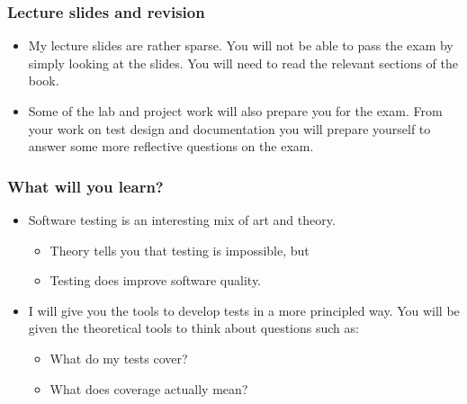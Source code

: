 \documentclass{beamer}
\begin{document}
\begin{frame}
  \frametitle{Lecture slides and revision}
  \begin{itemize}
  \item My lecture slides are rather sparse. You will not be able to
    pass the exam by simply looking at the slides. You will need to
    read the relevant sections of the book. 
\item Some of the lab and project work will also prepare you for the
  exam. From your work on test design and documentation you will
  prepare yourself to answer some more reflective questions on the exam.
  \end{itemize}
\end{frame}
\begin{frame}
  \frametitle{What will you learn?}
  \begin{itemize}
  \item Software testing is an interesting mix of art and theory.
    \begin{itemize}
    \item Theory tells you that testing is impossible, but
    \item Testing does improve software quality.
    \end{itemize}
  \item I will give you the tools to develop tests in a more
    principled way. You will be given the theoretical tools to think
    about questions such as:
    \begin{itemize}
    \item What do my tests cover?
    \item What does coverage actually mean? 
    \end{itemize}
  \end{itemize}
\end{frame}
\end{document}
